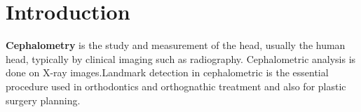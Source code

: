 \documentclass[sn-mathphys]{sn-jnl}%
\theoremstyle{thmstyleone}%
\theoremstyle{thmstyletwo}%
\theoremstyle{thmstylethree}%
\begin{document}
% 
% 
% 




\maketitle

\section{Introduction}\label{Introduction}
\textbf{Cephalometry} is the study and measurement of the head, usually the human head, typically by clinical imaging such as radiography. Cephalometric analysis is done on  X-ray images.Landmark detection in cephalometric is the essential procedure used in  orthodontics and orthognathic treatment and also for plastic surgery planning.
\end{document}
